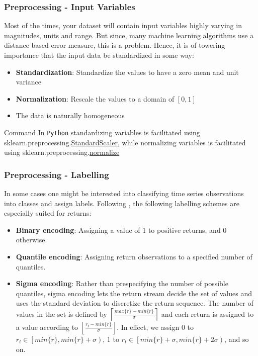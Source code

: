 \documentclass[xcolor=dvipsnames, english, 8pt]{beamer}
\begin{document}
\begin{frame}
    \frametitle{Preprocessing - Input Variables}
Most of the times, your dataset will contain input variables highly varying in magnitudes, units and range. But since, many machine learning algorithms use a distance based error measure, this is a problem. Hence, it is of towering importance that the input data be standardized in some way:\vspace{0.25cm}\\
\begin{itemize}
    \item {\textbf{\color{ubRed}Standardization}:} Standardize the values to have a zero mean and unit variance
    \item {\textbf{\color{ubRed}Normalization}:} Rescale the values to a domain of $[0,1]$
    \item The data is naturally homogeneous
\end{itemize}
\vfill
\begin{exampleblock}{{\small{Command}}}
In \texttt{Python} standardizing variables is facilitated using sklearn.preprocessing.\href{https://scikit-learn.org/stable/modules/generated/sklearn.preprocessing.StandardScaler.html}{\color{Purple}StandardScaler}, while normalizing variables is facilitated using sklearn.preprocessing.\href{https://scikit-learn.org/stable/modules/generated/sklearn.preprocessing.normalize.html}{\color{Purple}normalize}
\end{exampleblock}

\end{frame}


\begin{frame}
    \frametitle{Preprocessing - Labelling}
    In some cases one might be interested into classifying time series observations into classes and assign {\color{ubRed}labels}. Following \cite{DePrado2018}, the following labelling schemes are especially suited for returns:\vspace{0.25cm}\\
    \begin{itemize}
        \item {\textbf{\color{ubRed}Binary encoding}:} Assigning a value of 1 to positive returns, and 0 otherwise.
        \item {\textbf{\color{ubRed}Quantile encoding}:} Assigning return observations to a specified number of quantiles.
        \item {\textbf{\color{ubRed}Sigma encoding}:} Rather than prespecifying the number of possible quantiles, sigma encoding lets the return stream decide the set of values and uses the standard deviation to discretize the return sequence. The number of values in the set is defined by $\left\lceil \frac{max\{r\} - min\{r\}}{\sigma}\right\rceil$ and each return is assigned to a value according to $\left\lfloor \frac{r_t - min\{r\}}{\sigma}\right\rfloor$. In effect, we assign 0 to $r_t \in \left[min\{r\},min\{r\}+\sigma\right)$, 1 to $r_t \in \left[min\{r\}+\sigma,min\{r\}+2\sigma\right)$, and so on.
    \end{itemize}
\end{frame}
\end{document}
